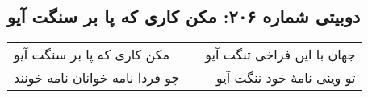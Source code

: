 \begin{center}
\section*{دوبیتی شماره ۲۰۶: مکن کاری که پا بر سنگت آیو}
\label{sec:206}
\begin{longtable}{l p{0.5cm} r}
مکن کاری که پا بر سنگت آیو
&&
جهان با این فراخی تنگت آیو
\\
چو فردا نامه خوانان نامه خونند
&&
تو وینی نامهٔ خود ننگت آیو
\\
\end{longtable}
\end{center}
